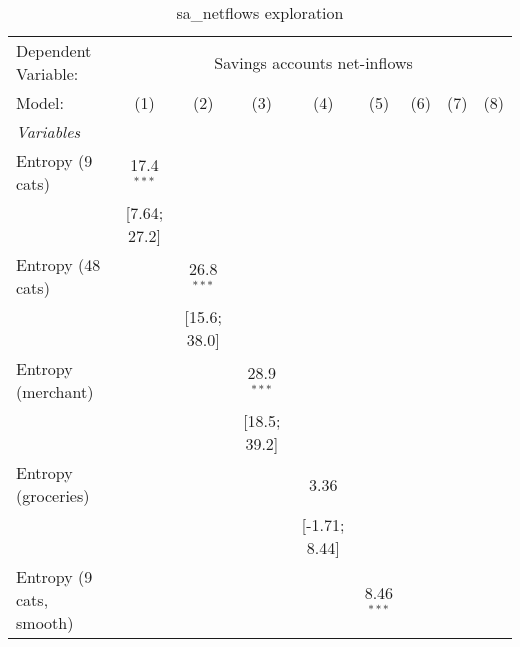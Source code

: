
\begin{table}[htbp]
   \centering
   \tiny
   \begin{threeparttable}[b]
      \caption{\label{tab:reg_sa_netflows} sa\_netflows exploration}
      \begin{tabular}{lcccccccc}
         \tabularnewline \midrule \midrule
         Dependent Variable: & \multicolumn{8}{c}{Savings accounts net-inflows}\\
         Model:                      & (1)             & (2)             & (3)             & (4)             & (5)              & (6)              & (7)              & (8)\\  
         \midrule
         \emph{Variables}\\
         Entropy (9 cats)            & 17.4$^{***}$    &                 &                 &                 &                  &                  &                  &   \\   
                                     & [7.64; 27.2]    &                 &                 &                 &                  &                  &                  &   \\   
         Entropy (48 cats)           &                 & 26.8$^{***}$    &                 &                 &                  &                  &                  &   \\   
                                     &                 & [15.6; 38.0]    &                 &                 &                  &                  &                  &   \\   
         Entropy (merchant)          &                 &                 & 28.9$^{***}$    &                 &                  &                  &                  &   \\   
                                     &                 &                 & [18.5; 39.2]    &                 &                  &                  &                  &   \\   
         Entropy (groceries)         &                 &                 &                 & 3.36            &                  &                  &                  &   \\   
                                     &                 &                 &                 & [-1.71; 8.44]   &                  &                  &                  &   \\   
         Entropy (9 cats, smooth)    &                 &                 &                 &                 & 8.46$^{***}$     &                  &                  &   \\   

\end{tabular}
\end{threeparttable}
\end{table}
